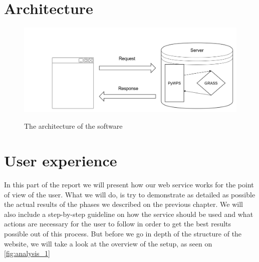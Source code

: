 \begin{figure}[h]
\end{figure}


\section{Architecture}
\begin{figure}[h!]
\centering
	{\includegraphics[width=\linewidth]{gfx/Analysis_Architecture/grass_pywps.png}}
\caption{The architecture of the software}
\label{fig:grass_archi}
\end{figure}


\section{User experience}
In this part of the report we will present  how our web service works for the point of view of the user. What we will do, is try to demonstrate as detailed as possible the actual results of the phases we described on the previous chapter. We will also include a step-by-step guideline on how the service should be used and what actions are necessary for the user to follow in order to get the best results possible out of this process. But before we go in depth of the structure of the website, we will take a look at the overview of the setup, as seen on \autoref{fig:analysis_1}

